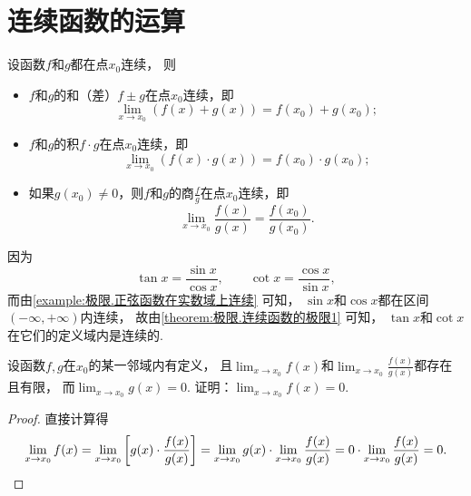 \section{连续函数的运算}
\begin{theorem}\label{theorem:极限.连续函数的极限1}
设函数\(f\)和\(g\)都在点\(x_0\)连续，
则\begin{itemize}
	\item \(f\)和\(g\)的和（差）\(f \pm g\)在点\(x_0\)连续，即\[
		\lim_{x \to x_0} (f(x) + g(x))
		= f(x_0) + g(x_0);
	\]
	\item \(f\)和\(g\)的积\(f \cdot g\)在点\(x_0\)连续，即\[
		\lim_{x \to x_0} (f(x) \cdot g(x))
		= f(x_0) \cdot g(x_0);
	\]
	\item 如果\(g(x_0)\neq0\)，则\(f\)和\(g\)的商\(\frac{f}{g}\)在点\(x_0\)连续，即\[
		\lim_{x \to x_0} \frac{f(x)}{g(x)}
		= \frac{f(x_0)}{g(x_0)}.
	\]
\end{itemize}
\end{theorem}

\begin{example}
因为\[
	\tan x=\frac{\sin x}{\cos x}, \qquad
	\cot x=\frac{\cos x}{\sin x},
\]
而由\cref{example:极限.正弦函数在实数域上连续} 可知，
\(\sin x\)和\(\cos x\)都在区间\((-\infty,+\infty)\)内连续，
故由\cref{theorem:极限.连续函数的极限1} 可知，
\(\tan x\)和\(\cot x\)在它们的定义域内是连续的.
\end{example}

\begin{example}
设函数\(f,g\)在\(x_0\)的某一邻域内有定义，
且\(\lim_{x\to x_0}f(x)\)和\(\lim_{x\to x_0}\frac{f(x)}{g(x)}\)都存在且有限，
而\(\lim_{x\to x_0}g(x)=0\).
证明：\(\lim_{x\to x_0}f(x)=0\).
\begin{proof}
直接计算得\[
	\lim_{x\to x_0}f(x)
	= \lim_{x\to x_0}\left[
		g(x) \cdot \frac{f(x)}{g(x)}
	\right]
	= \lim_{x\to x_0}g(x) \cdot \lim_{x\to x_0}\frac{f(x)}{g(x)}
	= 0 \cdot \lim_{x\to x_0}\frac{f(x)}{g(x)} = 0.
	\qedhere
\]
\end{proof}
\end{example}
